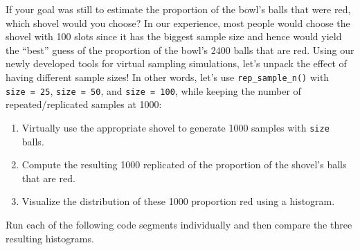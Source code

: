 \documentclass[12pt, krantz2,]{krantz}
\providecommand{\tightlist}{%
  \setlength{\itemsep}{0pt}\setlength{\parskip}{0pt}}
\begin{document}
If your goal was still to estimate the proportion of the bowl's balls that were red, which shovel would you choose? In our experience, most people would choose the shovel with 100 slots since it has the biggest sample size and hence would yield the ``best'' guess of the proportion of the bowl's 2400 balls that are red. Using our newly developed tools for virtual sampling simulations, let's unpack the effect of having different sample sizes! In other words, let's use \texttt{rep\_sample\_n()} with \texttt{size\ =\ 25}, \texttt{size\ =\ 50}, and \texttt{size\ =\ 100}, while keeping the number of repeated/replicated samples at 1000:

\begin{enumerate}
\def\labelenumi{\arabic{enumi}.}
\tightlist
\item
  Virtually use the appropriate shovel to generate 1000 samples with \texttt{size} balls.
\item
  Compute the resulting 1000 replicated of the proportion of the shovel's balls that are red.
\item
  Visualize the distribution of these 1000 proportion red using a histogram.
\end{enumerate}

Run each of the following code segments individually and then compare the three resulting histograms.
\end{document}
